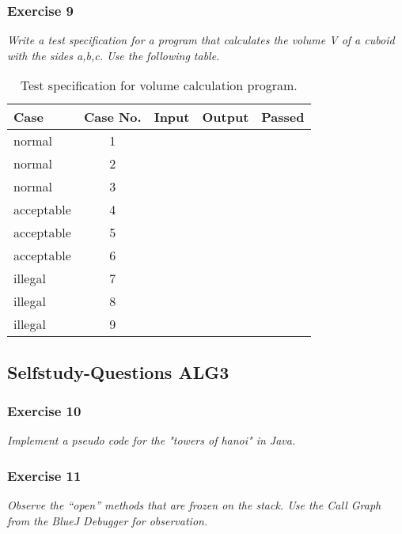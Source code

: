 \subsubsection*{Exercise 9}
\textit{Write a test specification for a program that calculates the volume V
of a cuboid with the sides a,b,c. Use the following table.}

\begin{table}
	\centering
	\begin{tabular}{l c p{4cm} p{4cm} c}
	Case & Case No. & Input & Output & Passed \\
	\hline
	normal 		& 1 & & & \\
	normal 		& 2 & & & \\
	normal 		& 3 & & & \\
	acceptable 	& 4 & & & \\
	acceptable 	& 5 & & & \\
	acceptable 	& 6 & & & \\
	illegal 	& 7 & & & \\
	illegal 	& 8 & & & \\
	illegal 	& 9 & & & \\
	\end{tabular}
	\caption{Test specification for volume calculation program.}
	\label{table:test-specification}
\end{table}


\subsection{Selfstudy-Questions ALG3}

\subsubsection*{Exercise 10}
\textit{Implement a pseudo code for the "towers of hanoi" in Java.} \\

\subsubsection*{Exercise 11}
\textit{Observe the "`open"' methods that are frozen on the stack.
Use the Call Graph from the BlueJ Debugger for observation.} \\
